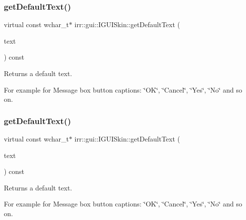\subsubsection{\texorpdfstring{get\+Default\+Text()}{getDefaultText()}\hspace{0.1cm}{\footnotesize\ttfamily [1/2]}}
{\footnotesize\ttfamily virtual const wchar\+\_\+t$\ast$ irr\+::gui\+::\+I\+G\+U\+I\+Skin\+::get\+Default\+Text (\begin{DoxyParamCaption}\item[{\hyperlink{namespaceirr_1_1gui_a18bc64c635f8b0db66498d779569e296}{E\+G\+U\+I\+\_\+\+D\+E\+F\+A\+U\+L\+T\+\_\+\+T\+E\+XT}}]{text }\end{DoxyParamCaption}) const\hspace{0.3cm}{\ttfamily [pure virtual]}}



Returns a default text. 

For example for Message box button captions\+: \char`\"{}\+O\+K\char`\"{}, \char`\"{}\+Cancel\char`\"{}, \char`\"{}\+Yes\char`\"{}, \char`\"{}\+No\char`\"{} and so on. \mbox{\label{classirr_1_1gui_1_1IGUISkin_a48a987d458a0e6f4e71fe6fd9cfecb2d}} 
\subsubsection{\texorpdfstring{get\+Default\+Text()}{getDefaultText()}\hspace{0.1cm}{\footnotesize\ttfamily [2/2]}}
{\footnotesize\ttfamily virtual const wchar\+\_\+t$\ast$ irr\+::gui\+::\+I\+G\+U\+I\+Skin\+::get\+Default\+Text (\begin{DoxyParamCaption}\item[{\hyperlink{namespaceirr_1_1gui_a18bc64c635f8b0db66498d779569e296}{E\+G\+U\+I\+\_\+\+D\+E\+F\+A\+U\+L\+T\+\_\+\+T\+E\+XT}}]{text }\end{DoxyParamCaption}) const\hspace{0.3cm}{\ttfamily [pure virtual]}}



Returns a default text. 

For example for Message box button captions\+: \char`\"{}\+O\+K\char`\"{}, \char`\"{}\+Cancel\char`\"{}, \char`\"{}\+Yes\char`\"{}, \char`\"{}\+No\char`\"{} and so on. \mbox{\label{classirr_1_1gui_1_1IGUISkin_a1b96a5dcaa7ffb9228fc2095be6b18c5}} 

